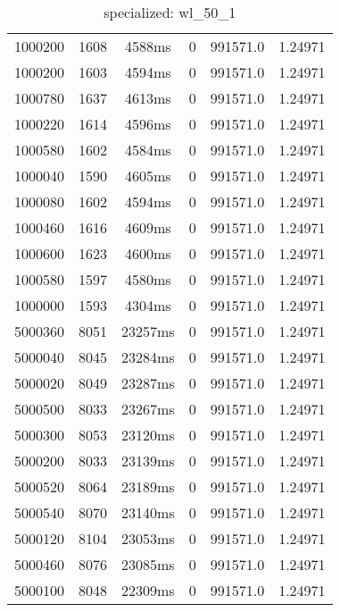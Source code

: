 \documentclass[./main.tex]{subfiles}
\begin{document}
\begin{table}
\begin{tabular}{ c | c | c | c | c | c }
        \hline
        \rowcolor{lightgray} 1000200 & 1608 & 4588ms & 0 & 991571.0 & 1.24971 \\
        \rowcolor{lightgray} 1000200 & 1603 & 4594ms & 0 & 991571.0 & 1.24971 \\
        \rowcolor{lightgray} 1000780 & 1637 & 4613ms & 0 & 991571.0 & 1.24971 \\
        \rowcolor{lightgray} 1000220 & 1614 & 4596ms & 0 & 991571.0 & 1.24971 \\
        \rowcolor{lightgray} 1000580 & 1602 & 4584ms & 0 & 991571.0 & 1.24971 \\
        \rowcolor{lightgray} 1000040 & 1590 & 4605ms & 0 & 991571.0 & 1.24971 \\
        \rowcolor{lightgray} 1000080 & 1602 & 4594ms & 0 & 991571.0 & 1.24971 \\
        \rowcolor{lightgray} 1000460 & 1616 & 4609ms & 0 & 991571.0 & 1.24971 \\
        \rowcolor{lightgray} 1000600 & 1623 & 4600ms & 0 & 991571.0 & 1.24971 \\
        \rowcolor{lightgray} 1000580 & 1597 & 4580ms & 0 & 991571.0 & 1.24971 \\
        \rowcolor{lightgray} 1000000 & 1593 & 4304ms & 0 & 991571.0 & 1.24971 \\
        \hline
        \rowcolor{lightgray} 5000360 & 8051 & 23257ms & 0 & 991571.0 & 1.24971 \\
        \rowcolor{lightgray} 5000040 & 8045 & 23284ms & 0 & 991571.0 & 1.24971 \\
        \rowcolor{lightgray} 5000020 & 8049 & 23287ms & 0 & 991571.0 & 1.24971 \\
        \rowcolor{lightgray} 5000500 & 8033 & 23267ms & 0 & 991571.0 & 1.24971 \\
        \rowcolor{lightgray} 5000300 & 8053 & 23120ms & 0 & 991571.0 & 1.24971 \\
        \rowcolor{lightgray} 5000200 & 8033 & 23139ms & 0 & 991571.0 & 1.24971 \\
        \rowcolor{lightgray} 5000520 & 8064 & 23189ms & 0 & 991571.0 & 1.24971 \\
        \rowcolor{lightgray} 5000540 & 8070 & 23140ms & 0 & 991571.0 & 1.24971 \\
        \rowcolor{lightgray} 5000120 & 8104 & 23053ms & 0 & 991571.0 & 1.24971 \\
        \rowcolor{lightgray} 5000460 & 8076 & 23085ms & 0 & 991571.0 & 1.24971 \\
        \rowcolor{lightgray} 5000100 & 8048 & 22309ms & 0 & 991571.0 & 1.24971 \\
    \end{tabular}
    \caption{specialized: wl\_50\_1}
\end{table}
\end{document}
